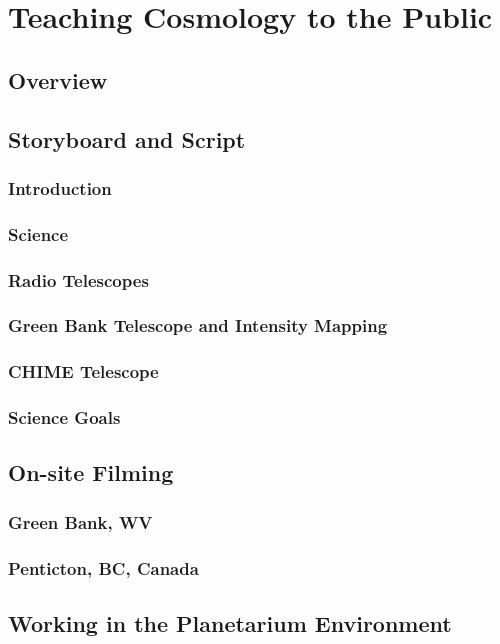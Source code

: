\chapter{Teaching \cm Cosmology to the Public}

\section{Overview}
\section{Storyboard and Script}

\subsection{Introduction}
\subsection{\cm Science}
\subsection{Radio Telescopes}
\subsection{Green Bank Telescope and Intensity Mapping}
\subsection{CHIME Telescope}
\subsection{Science Goals}

\section{On-site Filming}

\subsection{Green Bank, WV}
\subsection{Penticton, BC, Canada}

\section{Working in the Planetarium Environment}

